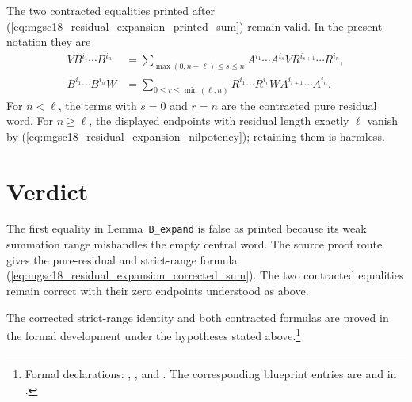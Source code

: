 \documentclass{article}
\begin{document}
The two contracted equalities printed after
(\ref{eq:mgsc18_residual_expansion_printed_sum}) remain valid.  In the present
notation they are
\begin{align}
    VB^{i_1}\cdots B^{i_n}
        &=\sum_{\max(0,n-\ell)\leq s\leq n}
          A^{i_1}\cdots A^{i_s}V
          R^{i_{s+1}}\cdots R^{i_n},
    \label{eq:mgsc18_residual_expansion_left_contraction}\\
    B^{i_1}\cdots B^{i_n}W
        &=\sum_{0\leq r\leq\min(\ell,n)}
          R^{i_1}\cdots R^{i_r}W
          A^{i_{r+1}}\cdots A^{i_n}.
    \label{eq:mgsc18_residual_expansion_right_contraction}
\end{align}
For $n<\ell$, the terms with $s=0$ and $r=n$ are the contracted pure
residual word.  For $n\geq\ell$, the displayed endpoints with residual length
exactly $\ell$ vanish by
(\ref{eq:mgsc18_residual_expansion_nilpotency}); retaining them is harmless.

\section{Verdict}

The first equality in Lemma~\texttt{B\_expand} is false as printed because its
weak summation range mishandles the empty central word.  The source proof route
gives the pure-residual and strict-range formula
(\ref{eq:mgsc18_residual_expansion_corrected_sum}).  The two contracted
equalities remain correct with their zero endpoints understood as above.

The corrected strict-range identity and both contracted formulas are proved in
the formal development under the hypotheses stated above.\footnote{Formal
declarations:
,
,
and
.
The corresponding blueprint entries are
 and
 in
.}



\end{document}
